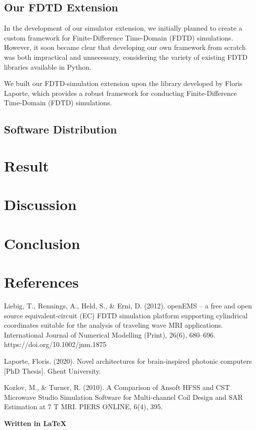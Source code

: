 \documentclass[11pt, a4paper, titlepage]{article}
\begin{document}
\subsection{Our FDTD Extension}
In the development of our simulator extension, we initially planned to create a custom framework for Finite-Difference Time-Domain (FDTD) simulations. However, it soon became clear that developing our own framework from scratch was both impractical and unnecessary, considering the variety of existing FDTD libraries available in Python.

We built our FDTD-simulation extension upon the library developed by Floris Laporte, which provides a robust framework for conducting Finite-Difference Time-Domain (FDTD) simulations.

\subsection{Software Distribution}


\newpage
\section{Result}
\newpage
\section{Discussion}
\newpage
\section{Conclusion}
\newpage
\section{References}
Liebig, T., Rennings, A., Held, S., \& Erni, D. (2012). openEMS – a free and open source equivalent‐circuit (EC) FDTD simulation platform supporting cylindrical coordinates suitable for the analysis of traveling wave MRI applications. International Journal of Numerical Modelling (Print), 26(6), 680–696. https://doi.org/10.1002/jnm.1875

Laporte, Floris. (2020). Novel architectures for brain-inspired photonic computers [PhD Thesis]. Ghent University.

Kozlov, M., \& Turner, R. (2010). A Comparison of Ansoft HFSS and CST Microwave Studio Simulation Software for Multi-channel Coil Design and SAR Estimation at 7 T MRI. PIERS ONLINE, 6(4), 395.



\newpage
\newpage
{} 
\printbibliography




\begin{center}
	\large\textbf{Written in \LaTeX}
\end{center}
\end{document}
